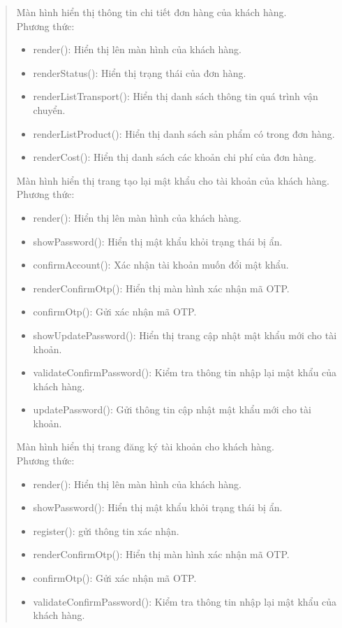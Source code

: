 \begin{quote}
    Màn hình hiển thị thông tin chi tiết đơn hàng của khách hàng.\\
    Phương thức:
    \begin{itemize}
        \item render(): Hiển thị lên màn hình của khách hàng.
        \item renderStatus(): Hiển thị trạng thái của đơn hàng.
        \item renderListTransport(): Hiển thị danh sách thông tin quá trình vận chuyển.
        \item renderListProduct(): Hiển thị danh sách sản phẩm có trong đơn hàng.
        \item renderCost(): Hiển thị danh sách các khoản chi phí của đơn hàng.
    \end{itemize}
   
    Màn hình hiển thị trang tạo lại mật khẩu cho tài khoản của khách hàng.\\
    Phương thức:
    \begin{itemize}
        \item render(): Hiển thị lên màn hình của khách hàng.
        \item showPassword(): Hiển thị mật khẩu khỏi trạng thái bị ẩn.
        \item confirmAccount(): Xác nhận tài khoản muốn đổi mật khẩu.
        \item renderConfirmOtp(): Hiển thị màn hình xác nhận mã OTP.
        \item confirmOtp(): Gửi xác nhận mã OTP.
        \item showUpdatePassword(): Hiển thị trang cập nhật mật khẩu mới cho tài khoản.
        \item validateConfirmPassword(): Kiểm tra thông tin nhập lại mật khẩu của khách hàng.
        \item updatePassword(): Gửi thông tin cập nhật mật khẩu mới cho tài khoản.
    \end{itemize}
   
    Màn hình hiển thị trang đăng ký tài khoản cho khách hàng.\\
    Phương thức:
    \begin{itemize}
        \item render(): Hiển thị lên màn hình của khách hàng.
        \item showPassword(): Hiển thị mật khẩu khỏi trạng thái bị ẩn.
        \item register(): gửi thông tin xác nhận.
        \item renderConfirmOtp(): Hiển thị màn hình xác nhận mã OTP.
        \item confirmOtp(): Gửi xác nhận mã OTP.
        \item validateConfirmPassword(): Kiểm tra thông tin nhập lại mật khẩu của khách hàng.
    \end{itemize}
   

\end{quote}
